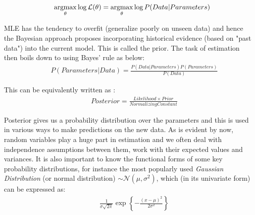 \documentclass[a4paper]{article}
\begin{document}
\begin{equation} \label{eq:1}
\begin{aligned}
&& \underset{\theta}{\operatorname{argmax}} \log {\cal L } (\theta) = \underset{\theta}{\operatorname{argmax}} \log P(Data|Parameters)
\end{aligned}
\end{equation}


\noindent  MLE has the tendency to overfit (generalize poorly on unseen data) and hence the Bayesian approach proposes incorporating historical evidence (based on "past data") into the current model. This is called the prior. The task of estimation then boils down to using Bayes' rule as below: \\

\begin{equation} \label{eq:2}
\begin{aligned}
& & P (Parameters|Data) = \frac{ P(Data|Parameters) P(Parameters)}{P(Data)}
\end{aligned}
\end{equation}

\noindent This can be equivalently written as : \\
\begin{equation} \label{eq:3}
\begin{aligned}
& & Posterior = \frac{ Likelihood \times Prior}{Normalizing Constant}
\end{aligned}
\end{equation}

\noindent Posterior gives us a probability distribution over the parameters and this is used in various ways to make predictions on the new data. As is evident by now, random variables play a huge part in estimation and we often deal with independence assumptions between them, work with their expected values and variances. It is also important to know the functional forms of some key probability distributions, for instance the most popularly used {\it Gaussian Distribution} (or normal distribution) $\sim \mathcal{N} (\mu, \sigma^2)$, which (in its univariate form) can be expressed as: \\

\begin{equation} \label{eq:4}
\begin{aligned}
& & \frac{1}{\sigma \sqrt{2 \pi}} \exp \left\{ - \frac{(x-\mu)^2}{2 \sigma^2} \right\}
\end{aligned}
\end{equation}
\end{document}
